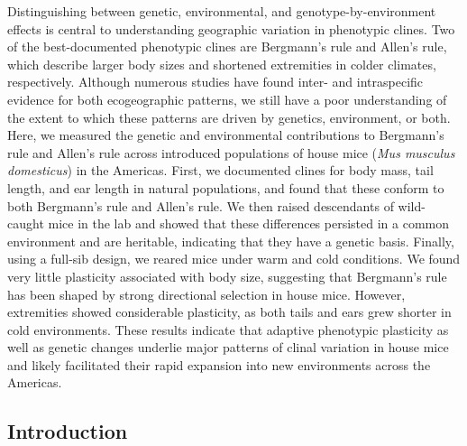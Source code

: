 \documentclass[
]{article}
\begin{document}
\noindent Distinguishing between genetic, environmental, and
genotype-by-environment effects is central to understanding geographic
variation in phenotypic clines. Two of the best-documented phenotypic
clines are Bergmann's rule and Allen's rule, which describe larger body
sizes and shortened extremities in colder climates, respectively.
Although numerous studies have found inter- and intraspecific evidence
for both ecogeographic patterns, we still have a poor understanding of
the extent to which these patterns are driven by genetics, environment,
or both. Here, we measured the genetic and environmental contributions
to Bergmann's rule and Allen's rule across introduced populations of
house mice (\emph{Mus musculus domesticus}) in the Americas. First, we
documented clines for body mass, tail length, and ear length in natural
populations, and found that these conform to both Bergmann's rule and
Allen's rule. We then raised descendants of wild-caught mice in the lab
and showed that these differences persisted in a common environment and
are heritable, indicating that they have a genetic basis. Finally, using
a full-sib design, we reared mice under warm and cold conditions. We
found very little plasticity associated with body size, suggesting that
Bergmann's rule has been shaped by strong directional selection in house
mice. However, extremities showed considerable plasticity, as both tails
and ears grew shorter in cold environments. These results indicate that
adaptive phenotypic plasticity as well as genetic changes underlie major
patterns of clinal variation in house mice and likely facilitated their
rapid expansion into new environments across the Americas.

\newpage

\hypertarget{introduction}{%
\subsection{Introduction}\label{introduction}}
\end{document}
